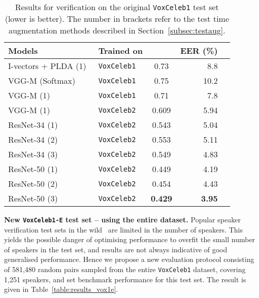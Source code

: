 \documentclass[a4paper]{article}
\def\newpara{\vspace{2pt}}
\def\aftertab{\vspace{-22pt}}
\begin{document}
\begin{table}[h!]
\centering
\footnotesize
\begin{tabular}{ l  l c r  r  }

\textbf{Models}             					& \textbf{Trained on} &  & EER (\%) \\ \hline  
 I-vectors + PLDA (1)~\cite{Nagrani17}				& \texttt{VoxCeleb1}      & 0.73     & 8.8    \\
 VGG-M (Softmax)~\cite{Nagrani17}		& \texttt{VoxCeleb1} & 0.75    & 10.2 \\ 
 VGG-M 	(1)		~\cite{Nagrani17}		& \texttt{VoxCeleb1} & 0.71    & 7.8 \\ 
 VGG-M 	(1)									  	& \texttt{VoxCeleb2} & 0.609 & 5.94 \\  \hline  
 
 ResNet-34 	(1)							& \texttt{VoxCeleb2} &  0.543 & 5.04 \\
 ResNet-34 	(2)							& \texttt{VoxCeleb2} &  0.553 & 5.11 \\
 ResNet-34 	(3)							& \texttt{VoxCeleb2} &  0.549 & 4.83 \\ \hline  
 
 ResNet-50 	(1)							& \texttt{VoxCeleb2} & 0.449 & 4.19 \\
 ResNet-50 	(2)							& \texttt{VoxCeleb2} & 0.454 & 4.43 \\
 ResNet-50	(3)							& \texttt{VoxCeleb2} &  \textbf{0.429} & \textbf{3.95}  \\ \hline  

\end{tabular} 
\caption{Results for verification on the original {\tt VoxCeleb1} test set (lower is better). The number in brackets refer to the test time augmentation methods described in Section~\ref{subsec:testaug}.}
\label{table:results}
\normalsize
\aftertab
\end{table}

\newpara\noindent\textbf{New \texttt{VoxCeleb1-E} test set --  using the entire dataset.}
Popular speaker verification test sets in the wild~\cite{Nagrani17, Mclaren16} are limited in the number of speakers. This yields the possible danger of optimising performance to overfit
the small number of speakers in the test set, and results are not
always indicative of good generalised performance. Hence we propose a
new evaluation protocol consisting of 581,480 random pairs sampled from the
entire \texttt{VoxCeleb1} dataset, covering 1,251 speakers, and set benchmark
performance for this test set.
The result is given in Table~\ref{table:results_vox1e}.
\end{document}
